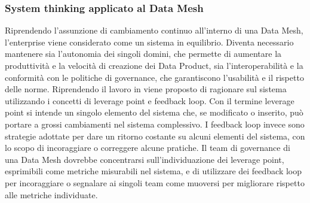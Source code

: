 \documentclass[12pt]{report}
\begin{document}
\subsubsection{System thinking applicato al Data Mesh}
Riprendendo l'assunzione di cambiamento continuo all'interno di una Data Mesh, l'enterprise viene considerato come un sistema in equilibrio.
Diventa necessario mantenere sia l'autonomia dei singoli domini, che permette di aumentare la produttività e la velocità di creazione dei Data Product, sia l'interoperabilità e la conformità con le politiche di governance, che garantiscono l'usabilità e il rispetto delle norme. 
Riprendendo il lavoro in \cite{meadows_thinking_2008} viene proposto di ragionare sul sistema utilizzando i concetti di leverage point e feedback loop.
Con il termine leverage point si intende un singolo elemento del sistema che, se modificato o inserito, può portare a grossi cambiamenti nel sistema complessivo.
I feedback loop invece sono strategie adottate per dare un ritorno costante su alcuni elementi del sistema, con lo scopo di incoraggiare o correggere alcune pratiche.
Il team di governance di una Data Mesh dovrebbe concentrarsi sull'individuazione dei leverage point, esprimibili come metriche misurabili nel sistema, e di utilizzare dei feedback loop per incoraggiare o segnalare ai singoli team come muoversi per migliorare rispetto alle metriche individuate. 
\end{document}

